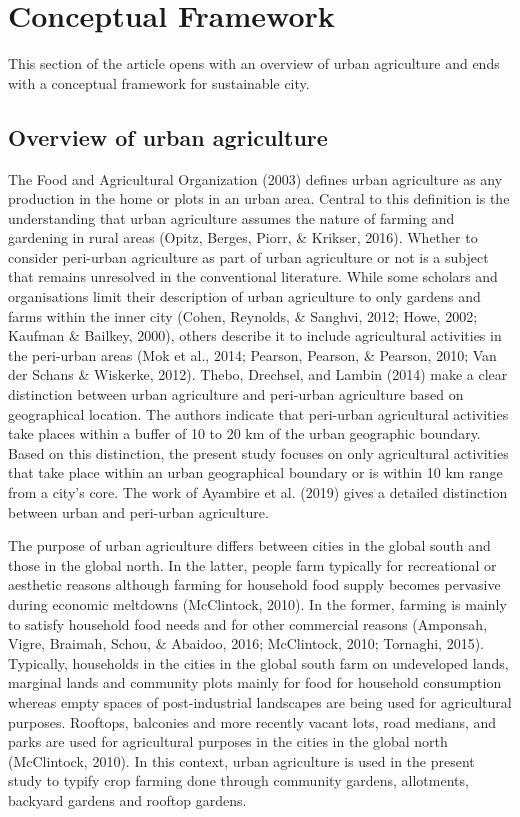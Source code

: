 \chapter{Conceptual Framework} %

\label{Chapter:ConceptualFramework}

This section of the article opens with an overview of urban agriculture and ends with a conceptual framework for sustainable city.

\section{Overview of urban agriculture}

The Food and Agricultural Organization (2003) defines urban agriculture as any production in the home or plots in an urban area. Central to this definition is the understanding that urban agriculture assumes the nature of farming and gardening in rural areas (Opitz, Berges, Piorr, \& Krikser, 2016). Whether to consider peri-urban agriculture as part of urban agriculture or not is a subject that remains unresolved in the conventional literature. While some scholars and organisations limit their description of urban agriculture to only gardens and farms within the inner city (Cohen, Reynolds, \& Sanghvi, 2012; Howe, 2002; Kaufman \& Bailkey, 2000), others describe it to include agricultural activities in the peri-urban areas (Mok et al., 2014; Pearson, Pearson, \& Pearson, 2010; Van der Schans \& Wiskerke, 2012). Thebo, Drechsel, and Lambin (2014) make a clear distinction between urban agriculture and peri-urban agriculture based on geographical location. The authors indicate that peri-urban agricultural activities take places within a buffer of 10 to 20 km of the urban geographic boundary. Based on this distinction, the present study focuses on only agricultural activities that take place within an urban geographical boundary or is within 10 km range from a city's core. The work of Ayambire et al. (2019) gives a detailed distinction between urban and peri-urban agriculture.

The purpose of urban agriculture differs between cities in the global south and those in the global north. In the latter, people farm typically for recreational or aesthetic reasons although farming for household food supply becomes pervasive during economic meltdowns (McClintock, 2010). In the former, farming is mainly to satisfy household food needs and for other commercial reasons (Amponsah, Vigre, Braimah, Schou, \& Abaidoo, 2016; McClintock, 2010; Tornaghi, 2015). Typically, households in the cities in the global south farm on undeveloped lands, marginal lands and community plots mainly for food for household consumption whereas empty spaces of post-industrial landscapes are being used for agricultural purposes. Rooftops, balconies and more recently vacant lots, road medians, and parks are used for agricultural purposes in the cities in the global north (McClintock, 2010). In this context, urban agriculture is used in the present study to typify crop farming done through community gardens, allotments, backyard gardens and rooftop gardens.

